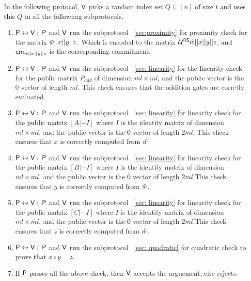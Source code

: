 In the following protocol, $\mathsf{V}$ picks a random index set $Q\subseteq [n]$ of size $t$ and uses this $Q$ in all the followimg subprotocols.
\begin{enumerate}
	\item $\mathsf{P} \leftrightarrow \mathsf{V}: $ $\mathsf{P}$ and $\mathsf{V}$ run the subprotocol ~\ref{sec:proximity} for proximity check for the matrix $\hat{w}||x||y||z$. Which is encoded to the matrix $\mathcal{U}^{\mathsf{RS}}{\hat{w}||x||y||z}$, and $\mathsf{cm}_{\hat{w}||x||y||z}$ is the corresponding commitment.
	
	\item $\mathsf{P} \leftrightarrow \mathsf{V}: $ $\mathsf{P}$ and $\mathsf{V}$ run the subprotocol ~\ref{sec: linearity} for the linearity check for the public matrix $P_{add}$ of dimension $ml\times ml$, and the public vector is the 0-vector of length $ml$. This check ensures that the addition gates are corretly evaluated.
	
	\item $\mathsf{P} \leftrightarrow \mathsf{V}:$ $\mathsf{P}$ and $\mathsf{V}$ run the subprotocol ~\ref{sec: linearity} for linearity check for the public matrix $[A|-I]$ where $I$ is the identity matrix of dimension $ml \times ml$, and the public vector is the 0 vector of length $2ml$. This check ensures that $x$ is correctly computed from $\hat{w}$.
	
	\item $\mathsf{P} \leftrightarrow \mathsf{V}:$ $\mathsf{P}$ and $\mathsf{V}$ run the subprotocol ~\ref{sec: linearity} for linearity check for the public matrix $[B|-I]$ where $I$ is the identity matrix of dimension $ml \times ml$, and the public vector is the 0 vector of length $2ml$.This check ensures that $y$ is correctly computed from $\hat{w}$.
	
	\item $\mathsf{P} \leftrightarrow \mathsf{V}:$ $\mathsf{P}$ and $\mathsf{V}$ run the subprotocol ~\ref{sec: linearity} for linearity check for the public matrix $[C|-I]$ where $I$ is the identity matrix of dimension $ml \times ml$, and the public vector is the 0 vector of length $2ml$.This check ensures that $z$ is correctly computed from $\hat{w}$.
	
	\item $\mathsf{P} \leftrightarrow \mathsf{V}:$ $\mathsf{P}$ and $\mathsf{V}$ run the subprotocol ~\ref{sec: quadratic} for quadratic check to prove that $x \circ y = z$.
	
	\item If $\mathsf{P}$ passes all the above check, then $\mathsf{V}$ accepts the arguement, else rejects.
\end{enumerate}


